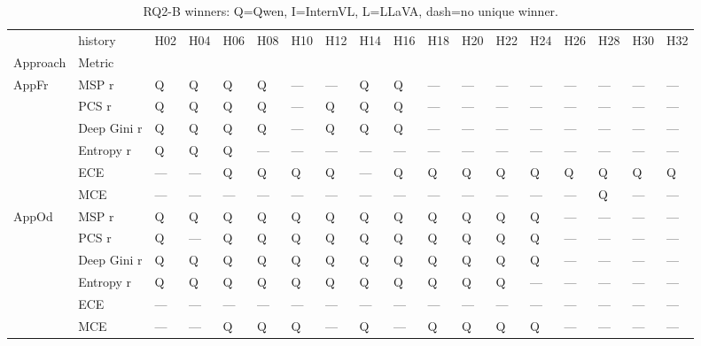 \begin{table}[tbp]
\caption{RQ2-B winners: Q=Qwen, I=InternVL, L=LLaVA, dash=no unique winner.}
\label{tab:rq2b-significant-model-winners}
\begin{tabular}{llllllllllllllllll}
\toprule
 & history & H02 & H04 & H06 & H08 & H10 & H12 & H14 & H16 & H18 & H20 & H22 & H24 & H26 & H28 & H30 & H32 \\
Approach & Metric &  &  &  &  &  &  &  &  &  &  &  &  &  &  &  &  \\
\midrule
\multirow[t]{6}{*}{AppFr} & MSP r & Q & Q & Q & Q & — & — & Q & Q & — & — & — & — & — & — & — & — \\
 & PCS r & Q & Q & Q & Q & — & Q & Q & Q & — & — & — & — & — & — & — & — \\
 & Deep Gini r & Q & Q & Q & Q & — & Q & Q & Q & — & — & — & — & — & — & — & — \\
 & Entropy r & Q & Q & Q & — & — & — & — & — & — & — & — & — & — & — & — & — \\
 & ECE & — & — & Q & Q & Q & Q & — & Q & Q & Q & Q & Q & Q & Q & Q & Q \\
 & MCE & — & — & — & — & — & — & — & — & — & — & — & — & — & Q & — & — \\
\cline{1-18}
\multirow[t]{6}{*}{AppOd} & MSP r & Q & Q & Q & Q & Q & Q & Q & Q & Q & Q & Q & Q & — & — & — & — \\
 & PCS r & Q & — & Q & Q & Q & Q & Q & Q & Q & Q & Q & Q & — & — & — & — \\
 & Deep Gini r & Q & Q & Q & Q & Q & Q & Q & Q & Q & Q & Q & Q & — & — & — & — \\
 & Entropy r & Q & Q & Q & Q & Q & Q & Q & Q & Q & Q & Q & — & — & — & — & — \\
 & ECE & — & — & — & — & — & — & — & — & — & — & — & — & — & — & — & — \\
 & MCE & — & — & Q & Q & Q & — & Q & — & Q & Q & Q & Q & — & — & — & — \\
\cline{1-18}
\bottomrule
\end{tabular}
\end{table}
